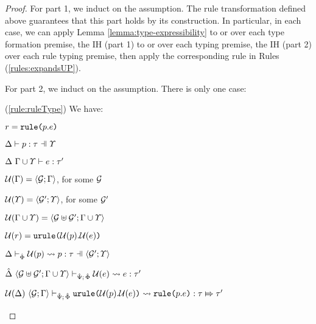 {{{{\begin{proof}
For part 1, we induct on the assumption. The rule transformation defined above guarantees that this part holds by its construction. In particular, in each case, we can apply Lemma \ref{lemma:type-expressibility} to or over each type formation premise, the IH (part 1) to or over each typing premise, the IH (part 2) over each rule typing premise, then apply the corresponding rule in Rules (\ref{rules:expandsUP}).

For part 2, we induct on the assumption. There is only one case:
\begin{byCases}
\item[(\ref{rule:ruleType})] We have:
\begin{pfsteps*}
\item $r = \texttt{rule}\texttt{(}p.e\texttt{)}$ 
\item $\patType{\pctx}{p}{\tau}$  
\item $\Delta~\Gamma \cup \varUpsilon \vdash e : \tau'$  
\item $\mathcal{U}(\Gamma)=\langle \mathcal{G}; \Gamma \rangle$, for some $\mathcal{G}$ 
\item $\mathcal{U}(\varUpsilon) =\langle \mathcal{G}'; \varUpsilon \rangle$, for some $\mathcal{G}'$ 
\item $\mathcal{U}(\Gamma \cup \varUpsilon) = \langle \mathcal{G} \uplus \mathcal{G}'; \Gamma \cup \varUpsilon \rangle$ 
\item $\mathcal{U}(r) = \texttt{urule}\texttt{(}\mathcal{U}(p).\mathcal{U}(e)\texttt{)}$ 
\item $\patExpands{\uGG{\uG'}{\pctx}}{\uPhi}{\Uof{p}}{p}{\tau}$  
\item $\hat{\Delta}~\langle \mathcal{G} \uplus \mathcal{G}'; {\Gamma}\cup{\varUpsilon} \rangle \vdash_{\hat{\Psi};\,\hat\Phi} \mathcal{U}(e) \leadsto e : \tau'$  
\item $\mathcal{U}(\Delta)~\langle \mathcal{G}; \Gamma \rangle \vdash_{\hat{\Psi};\,\hat\Phi} \texttt{urule}\texttt{(}\mathcal{U}(p).\mathcal{U}(e)\texttt{)} \leadsto \texttt{rule}\texttt{(}p.e\texttt{)} : \tau \Mapsto \tau'$ 
\end{pfsteps*}
\resetpfcounter
\end{byCases}
\end{proof}


}}}}
